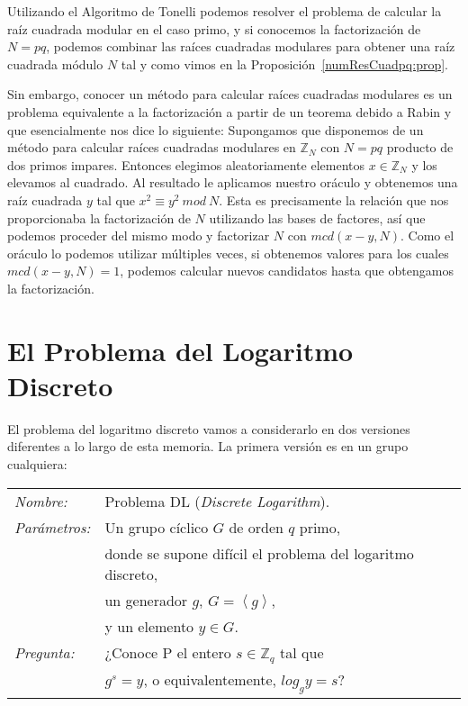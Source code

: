 Utilizando el Algoritmo de Tonelli podemos resolver el problema de calcular
la ra\'iz cuadrada modular en el caso primo, y si conocemos la factorizaci\'on
de $N = pq$, podemos combinar las ra\'ices cuadradas modulares para obtener una
ra\'iz cuadrada m\'odulo $N$ tal y como vimos en la
Proposici\'on~\ref{numResCuadpq:prop}.

Sin embargo, conocer un m\'etodo para calcular ra\'ices cuadradas modulares es un problema
equivalente a la factorizaci\'on a partir de un teorema debido a Rabin y que esencialmente nos
dice lo siguiente: Supongamos que disponemos de un m\'etodo para calcular ra\'ices cuadradas
modulares en ${\mathbb Z}_N$ con $N = pq$ producto de dos primos impares. Entonces elegimos
aleatoriamente elementos $x \in {\mathbb Z}_N$ y los elevamos al cuadrado. Al
resultado le aplicamos nuestro or\'aculo y obtenemos una ra\'iz cuadrada $y$ tal que $x^2
\equiv y^2 ~mod~N$. Esta es precisamente la relaci\'on que nos proporcionaba
la factorizaci\'on de $N$ utilizando las bases de factores, as\'i que podemos proceder del
mismo modo y factorizar $N$ con $mcd(x-y,N)$. Como el or\'aculo lo podemos
utilizar m\'ultiples veces, si obtenemos valores para los cuales $mcd(x-y,N) = 1$, podemos
calcular nuevos candidatos hasta que obtengamos la factorizaci\'on.


\section{El Problema del Logaritmo Discreto}

El problema del logaritmo discreto vamos a considerarlo en dos versiones diferentes a lo largo de esta memoria. La primera versi\'on es en un grupo cualquiera:

\hfil

\begin{tabular}{|ll}\label{problemaDL}\index{Problema del Logaritmo Discreto}\index{DL}
	\textit{Nombre:} & Problema DL (\textit{Discrete Logarithm}). \\
	\textit{Parámetros:} & Un grupo cíclico $G$ de orden $q$ primo, \\ & donde se supone difícil el problema del logaritmo discreto,  \\ & un generador $g$, $G=\left\langle g \right\rangle$,\\ & y un elemento $y\in G$. \\
	\textit{Pregunta:} & ¿Conoce P el entero $s\in \mathbb{Z}_q$ tal que \\ & $g^s = y$, o equivalentemente, $log_g y = s$? \\
\end{tabular}
\\

